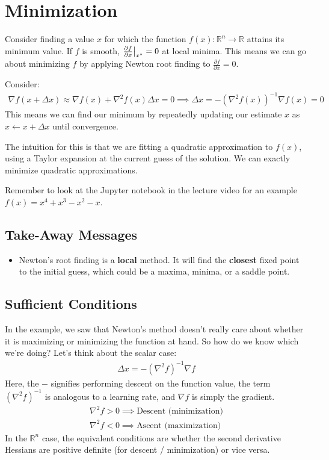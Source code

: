 \section{Minimization}
Consider finding a value $x$ for which the function $f(x): \mathbb{R}^n \longrightarrow \mathbb{R}$ attains its minimum value. If $f$ is smooth, $\evalat{\frac{\partial f}{\partial x}}{x^*} = 0$ at local minima. 
This means we can go about minimizing $f$ by applying Newton root finding to $\frac{\partial f}{\partial x}=0$. 

\noindent
Consider: 
\begin{align}
    \nabla f(x + \Delta x) \approx \nabla f(x) + \nabla^2 f(x) \Delta x = 0
    \implies \Delta x = - (\nabla^2 f(x))^{-1} \nabla f(x) = 0
\end{align}
This means we can find our minimum by repeatedly updating our estimate $x$ as $x \gets x + \Delta x$ until convergence. 

\noindent
The intuition for this is that we are fitting a quadratic approximation to $f(x)$, using a Taylor expansion at the current guess of the solution. We can exactly minimize quadratic approximations.

\noindent
Remember to look at the Jupyter notebook in the lecture video for an example $f(x) = x^4 + x^3 - x^2 -x$. 

\subsection{Take-Away Messages}
\begin{itemize}
        \item Newton's root finding is a \textbf{local} method. It will find the \textbf{closest} fixed point to the initial guess, which could be a maxima, minima, or a saddle point. 
\end{itemize}

\subsection{Sufficient Conditions}
In the example, we saw that Newton's method doesn't really care about whether it is maximizing or minimizing the function at hand. So how do we know which we're doing? Let's think about the scalar case: 
\begin{align}
    \Delta x = - (\nabla^2 f)^{-1} \nabla f
\end{align}
Here, the $-$ signifies performing descent on the function value, the term $(\nabla^2 f)^{-1}$ is analogous to a learning rate, and $\nabla f$ is simply the gradient. 
\begin{align}
    \nabla^2 f > 0 \implies \textrm{Descent (minimization)} \\
    \nabla^2 f < 0 \implies \textrm{Ascent (maximization)}
\end{align}
In the $\mathbb{R}^n$ case, the equivalent conditions are whether the second derivative Hessians are positive definite (for descent / minimization) or vice versa. 


